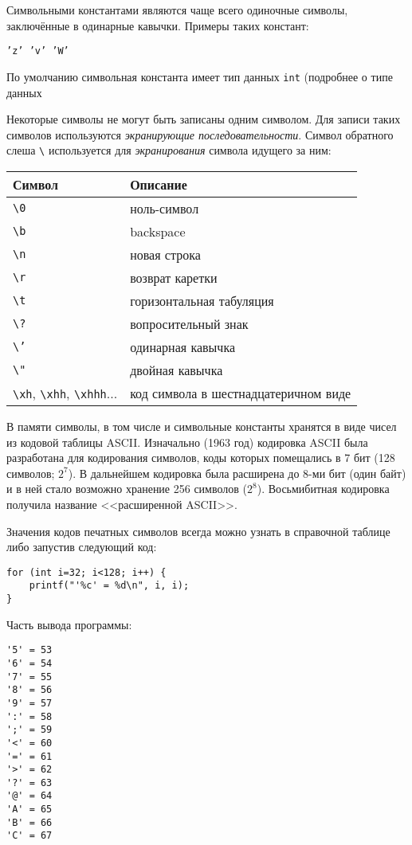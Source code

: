 \documentclass[myc.tex]{subfiles}
\begin{document}
Символьными константами являются чаще всего одиночные символы, заключённые в одинарные кавычки. Примеры таких констант: 

\texttt{'z' 'v' 'W'}

По умолчанию символьная константа имеет тип данных \texttt{int} (подробнее о типе данных %

Некоторые символы не могут быть записаны одним символом. Для записи таких символов используются \textit{экранирующие последовательности}. Символ обратного слеша \texttt{\textbackslash} используется для \textit{экранирования} символа идущего за ним:

\begin{small}
\begin{center}
\begin{tabular}{|l|l|}
\hline
\textbf{Символ} & \textbf{Описание}\\
\hline
\texttt{\textbackslash{}0} & ноль-символ\\
\hline
\texttt{\textbackslash{}b} & backspace\\
\hline
\texttt{\textbackslash{}n} & новая строка\\
\hline
\texttt{\textbackslash{}r} & возврат каретки\\
\hline
\texttt{\textbackslash{}t} & горизонтальная табуляция\\
\hline
\texttt{\textbackslash{}?} & вопросительный знак\\
\hline
\texttt{\textbackslash{}'} & одинарная кавычка\\
\hline
\texttt{\textbackslash{}"} & двойная кавычка\\
\hline
\texttt{\textbackslash{}xh}, \texttt{\textbackslash{}xhh}, \texttt{\textbackslash{}xhhh}... & код символа в шестнадцатеричном виде\\
\hline
\end{tabular}
\end{center}
\end{small}

В памяти символы, в том числе и символьные константы хранятся в виде чисел из кодовой таблицы ASCII. Изначально (1963 год) кодировка ASCII была разработана для кодирования символов, коды которых помещались в 7 бит (128 символов; $2^7$). В дальнейшем кодировка была расширена до 8-ми бит (один байт) и в ней стало возможно хранение 256 символов ($2^8$). Восьмибитная кодировка получила название <<расширенной ASCII>>.

Значения кодов печатных символов всегда можно узнать в справочной таблице либо запустив следующий код:
\begin{lstlisting}
for (int i=32; i<128; i++) {
    printf("'%c' = %d\n", i, i);
}
\end{lstlisting}
Часть вывода программы:
\begin{verbatim}
'5' = 53
'6' = 54
'7' = 55
'8' = 56
'9' = 57
':' = 58
';' = 59
'<' = 60
'=' = 61
'>' = 62
'?' = 63
'@' = 64
'A' = 65
'B' = 66
'C' = 67
\end{verbatim} 
\end{document}
